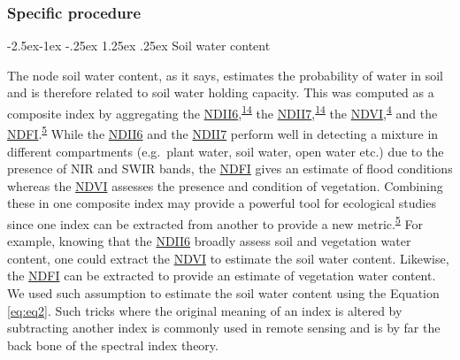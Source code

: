 \documentclass[12pt,oneside]{article}
\makeatletter
\renewcommand\paragraph{\@startsection{paragraph}{4}{\z@}%
            {-2.5ex\@plus -1ex \@minus -.25ex}%
            {1.25ex \@plus .25ex}%
            {\normalfont\normalsize\bfseries}}
\makeatother
\begin{document}
\hypertarget{I52}{%
\subsubsection{Specific procedure}\label{I52}}

\hypertarget{I521}{%
\paragraph{Soil water content}\label{I521}}

The node soil water content, as it says, estimates the probability of water in soil and is therefore related to soil water holding capacity. This was computed as a composite index by aggregating the \href{https://www.sciencedirect.com/science/article/pii/0034425789900461?via\%3Dihub}{NDII6},\textsuperscript{\protect\hyperlink{ref-Hunt_and_Rock_1989}{14}} the \href{https://www.sciencedirect.com/science/article/pii/0034425789900461?via\%3Dihub}{NDII7},\textsuperscript{\protect\hyperlink{ref-Hunt_and_Rock_1989}{14}} the \href{https://www.sciencedirect.com/science/article/pii/0034425779900130?via\%3Dihub}{NDVI},\textsuperscript{\protect\hyperlink{ref-Tucker_1979}{4}} and the \href{http://journals.plos.org/plosone/article/file?id=10.1371/journal.pone.0088741\&type=printable}{NDFI}.\textsuperscript{\protect\hyperlink{ref-Boschetti_et_al_2014}{5}} While the \href{https://www.sciencedirect.com/science/article/pii/0034425789900461?via\%3Dihub}{NDII6} and the \href{https://www.sciencedirect.com/science/article/pii/0034425789900461?via\%3Dihub}{NDII7} perform well in detecting a mixture in different compartments (e.g.~plant water, soil water, open water etc.) due to the presence of NIR and SWIR bands, the \href{http://journals.plos.org/plosone/article/file?id=10.1371/journal.pone.0088741\&type=printable}{NDFI} gives an estimate of flood conditions whereas the \href{https://www.sciencedirect.com/science/article/pii/0034425779900130?via\%3Dihub}{NDVI} assesses the presence and condition of vegetation. Combining these in one composite index may provide a powerful tool for ecological studies since one index can be extracted from another to provide a new metric.\textsuperscript{\protect\hyperlink{ref-Boschetti_et_al_2014}{5}} For example, knowing that the \href{https://www.sciencedirect.com/science/article/pii/0034425789900461?via\%3Dihub}{NDII6} broadly assess soil and vegetation water content, one could extract the \href{https://www.sciencedirect.com/science/article/pii/0034425779900130?via\%3Dihub}{NDVI} to estimate the soil water content. Likewise, the \href{http://journals.plos.org/plosone/article/file?id=10.1371/journal.pone.0088741\&type=printable}{NDFI} can be extracted to provide an estimate of vegetation water content. We used such assumption to estimate the soil water content using the Equation \eqref{eq:eq2}. Such tricks where the original meaning of an index is altered by subtracting another index is commonly used in remote sensing and is by far the back bone of the spectral index theory.
\end{document}
